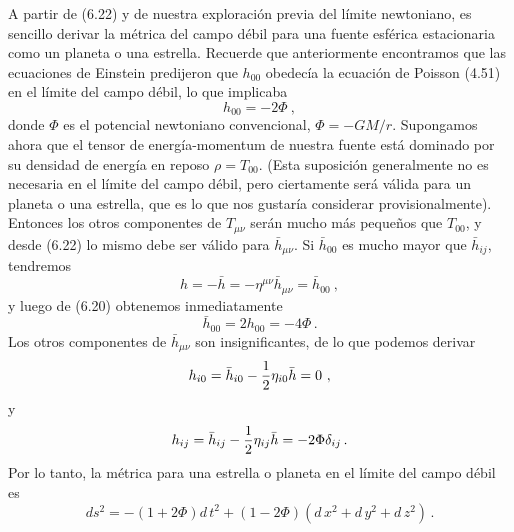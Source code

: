 \documentclass[11pt,b5paper,openany,twoside]{book}
\newcommand{\mn}{{\mu\nu}}
\begin{document}
A partir de (6.22) y de nuestra exploración previa del límite newtoniano, es sencillo derivar la métrica del campo débil para una fuente esférica estacionaria como un planeta o una estrella.
Recuerde que anteriormente encontramos que las ecuaciones de Einstein predijeron que $h_{00}$ obedecía la ecuación de Poisson (4.51) en el límite del campo débil, lo que implicaba
\begin{equation}
h_{00} = -2\Phi\ ,\label{6.24}
\end{equation}
donde $\Phi$ es el potencial newtoniano convencional, $\Phi=-GM/r$.
Supongamos ahora que el tensor de energía-momentum de nuestra fuente está dominado por su densidad de energía en reposo $\rho=T_{00}$.
(Esta suposición generalmente no es necesaria en el límite del campo débil, pero ciertamente será válida para un planeta o una estrella, que es lo que nos gustaría considerar provisionalmente).
Entonces los otros componentes de $T_\mn$ serán mucho más pequeños que $T_{00}$, y desde (6.22) lo mismo debe ser válido para $\bar h_\mn$.
Si $\bar h_{00}$ es mucho mayor que $\bar h_{ij}$, tendremos
\begin{equation}
h = -\bar h=-\eta^\mn \bar h_\mn = \bar h_{00}\ ,\label{6.25}
\end{equation}
y luego de (6.20) obtenemos inmediatamente
\begin{equation}
\bar h_{00} = 2 h_{00} =-4\Phi\,.\label{6.26}
\end{equation}
Los otros componentes de $\bar h_{\mn}$ son insignificantes, de lo que podemos derivar
\begin{equation}
h_{i0} = \bar h_{i0} - {1\over 2}\eta_{i0}\bar h = 0\ ,\label{6.27}
\end{equation}
y
\begin{equation}
h_{ij}= \bar h_{ij} - {1\over 2}\eta_{ij}\bar h = -2\Phi\delta_{ij}\,.
\label{6.28}
\end{equation}
Por lo tanto, la métrica para una estrella o planeta en el límite del campo débil es
\begin{equation}
ds^2 = -(1+2\Phi) d\,t^2 +(1-2\Phi)( d\,x^2 + d\,y^2 + d\,z^2)\,.
\label{6.29}
\end{equation}
\end{document}
